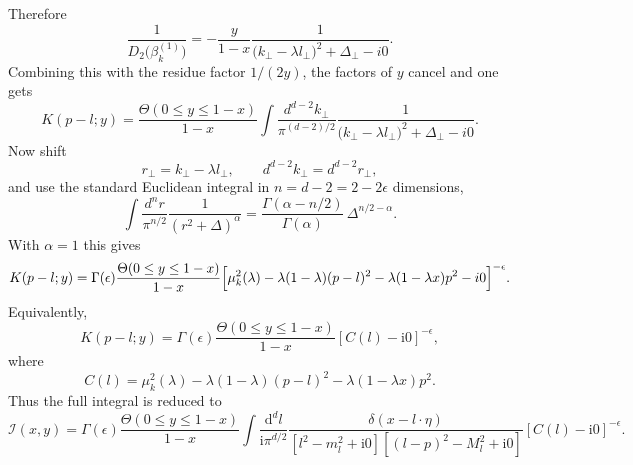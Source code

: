 \documentclass[11pt]{article}
\newcommand{\dd}{\mathrm d}
\newcommand{\ii}{\mathrm i}
\newcommand{\eps}{\epsilon}
\begin{document}
Therefore
\begin{equation}
\frac{1}{D_2\bigl(\beta_k^{(1)}\bigr)}
=-\frac{y}{1-x}
\frac{1}{\bigl(k_\perp-\lambda l_\perp\bigr)^2+\Delta_\perp-i0}.
\label{eq:invD2}
\end{equation}
Combining this with the residue factor $1/(2y)$, the factors of $y$ cancel and one gets
\begin{equation}
K(p-l;y)=
\frac{\Theta(0\le y\le 1-x)}{1-x}
\int \frac{d^{d-2}k_\perp}{\pi^{(d-2)/2}}
\frac{1}{\bigl(k_\perp-\lambda l_\perp\bigr)^2+\Delta_\perp-i0}.
\label{eq:K-after-residue}
\end{equation}
Now shift
\[
r_\perp=k_\perp-\lambda l_\perp,
\qquad d^{d-2}k_\perp=d^{d-2}r_\perp,
\]
and use the standard Euclidean integral in $n=d-2=2-2\epsilon$ dimensions,
\[
\int \frac{d^n r}{\pi^{n/2}}\frac{1}{(r^2+\Delta)^\alpha}
=
\frac{\Gamma(\alpha-n/2)}{\Gamma(\alpha)}\,\Delta^{n/2-\alpha}.
\]
With $\alpha=1$ this gives
\begin{equation}
K(p-l;y)=
\Gamma(\epsilon)
\frac{\Theta(0\le y\le 1-x)}{1-x}
\Bigl[\mu_k^2(\lambda)-\lambda(1-\lambda)(p-l)^2-\lambda(1-\lambda x)p^2-i0\Bigr]^{-\epsilon}.
\label{eq:K-final}
\end{equation}
Equivalently,
\begin{equation}
K(p-l;y)
=
\Gamma(\eps)
\frac{\Theta(0\le y\le 1-x)}{1-x}
\left[C(l)-\ii0\right]^{-\eps},
\label{eq:k-subloop}
\end{equation}
where
\begin{equation}
C(l)
=
\mu_k^2(\lambda)-\lambda(1-\lambda)(p-l)^2
-\lambda(1-\lambda x)p^2.
\label{eq:C-l}
\end{equation}
Thus the full integral is reduced to
\begin{equation}
\boxed{
\mathcal I(x,y)
=
\Gamma(\eps)
\frac{\Theta(0\le y\le 1-x)}{1-x}
\int \frac{\dd^d l}{\ii\pi^{d/2}}
\frac{\delta(x-l\cdot\eta)}
{[l^2-m_l^2+\ii0][(l-p)^2-M_l^2+\ii0]}
[C(l)-\ii0]^{-\eps}.
}
\label{eq:after-k-subloop}
\end{equation}

\newpage
\end{document}
